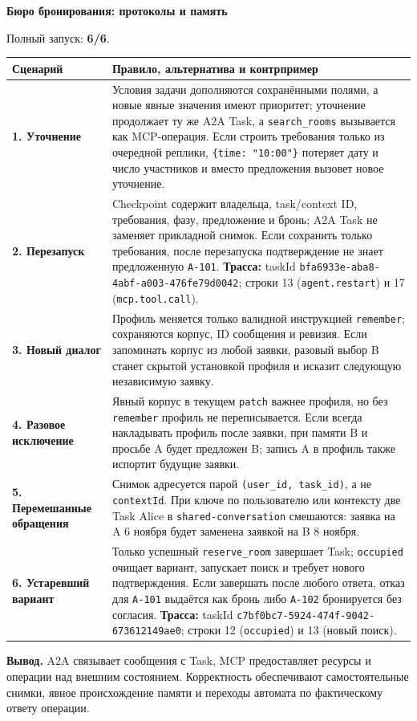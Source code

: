 \documentclass[9pt,a4paper]{article}
\begin{document}
\begin{center}\large\textbf{Бюро бронирования: протоколы и память}\end{center}
\noindent Полный запуск: \textbf{6/6}.

\small
\begin{tabularx}{\textwidth}{>{\RaggedRight\bfseries}p{} >{\RaggedRight\arraybackslash}X}
\toprule
Сценарий & Правило, альтернатива и контрпример \\\midrule
1. Уточнение & Условия задачи дополняются сохранёнными полями, а новые явные значения имеют приоритет; уточнение продолжает ту же A2A Task, а \texttt{search\_rooms} вызывается как MCP-операция. Если строить требования только из очередной реплики, \texttt{\{time: "10:00"\}} потеряет дату и число участников и вместо предложения вызовет новое уточнение. \\
2. Перезапуск & Checkpoint содержит владельца, task/context ID, требования, фазу, предложение и бронь; A2A Task не заменяет прикладной снимок. Если сохранить только требования, после перезапуска подтверждение не знает предложенную \texttt{A-101}. \textbf{Трасса:} taskId \texttt{bfa6933e-aba8-4abf-a003-476fe79d0042}; строки 13 (\texttt{agent.restart}) и 17 (\texttt{mcp.tool.call}). \\
3. Новый диалог & Профиль меняется только валидной инструкцией \texttt{remember}; сохраняются корпус, ID сообщения и ревизия. Если запоминать корпус из любой заявки, разовый выбор B станет скрытой установкой профиля и исказит следующую независимую заявку. \\
4. Разовое исключение & Явный корпус в текущем \texttt{patch} важнее профиля, но без \texttt{remember} профиль не переписывается. Если всегда накладывать профиль после заявки, при памяти B и просьбе A будет предложен B; запись A в профиль также испортит будущие заявки. \\
5. Перемешанные обращения & Снимок адресуется парой \texttt{(user\_id, task\_id)}, а не \texttt{contextId}. При ключе по пользователю или контексту две Task Alice в \texttt{shared-conversation} смешаются: заявка на A 6 ноября будет заменена заявкой на B 8 ноября. \\
6. Устаревший вариант & Только успешный \texttt{reserve\_room} завершает Task; \texttt{occupied} очищает вариант, запускает поиск и требует нового подтверждения. Если завершать после любого ответа, отказ для \texttt{A-101} выдаётся как бронь либо \texttt{A-102} бронируется без согласия. \textbf{Трасса:} taskId \texttt{c7bf0bc7-5924-474f-9042-673612149ae0}; строки 12 (\texttt{occupied}) и 13 (новый поиск). \\
\bottomrule
\end{tabularx}

\vspace{0.35em}\noindent\textbf{Вывод.} A2A связывает сообщения с Task, MCP предоставляет ресурсы и операции над внешним состоянием. Корректность обеспечивают самостоятельные снимки, явное происхождение памяти и переходы автомата по фактическому ответу операции.
\end{document}
